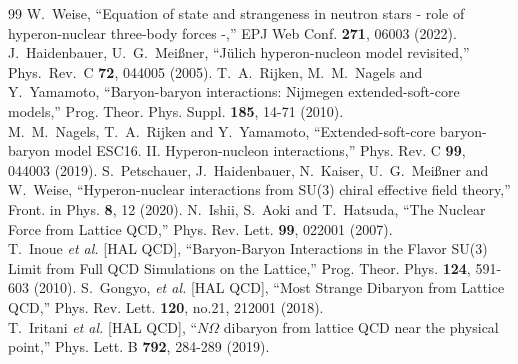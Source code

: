 \documentclass[aps,prd,showpacs,floatfix,reprint,nofootinbib]{revtex4-1}
\begin{document}
\begin{thebibliography}{99}
W.~Weise,
``Equation of state and strangeness in neutron stars - role of hyperon-nuclear three-body forces -,''
EPJ Web Conf. \textbf{271}, 06003 (2022).
J.~Haidenbauer, U.~G.~Mei\ss{}ner, 
``Jülich hyperon-nucleon model revisited,''
Phys.\ Rev.\ C \textbf{72}, 044005 (2005).
T.~A.~Rijken, M.~M.~Nagels and Y.~Yamamoto,
``Baryon-baryon interactions: Nijmegen extended-soft-core models,''
Prog. Theor. Phys. Suppl. \textbf{185}, 14-71 (2010).\\
M.~M.~Nagels, T.~A.~Rijken and Y.~Yamamoto,
``Extended-soft-core baryon-baryon model ESC16. II. Hyperon-nucleon interactions,''
Phys. Rev. C \textbf{99}, 044003 (2019).
S.~Petschauer, J.~Haidenbauer, N.~Kaiser, U.~G.~Mei\ss{}ner and W.~Weise,
``Hyperon-nuclear interactions from SU(3) chiral effective field theory,''
Front. in Phys. \textbf{8}, 12 (2020).
N.~Ishii, S.~Aoki and T.~Hatsuda,
``The Nuclear Force from Lattice QCD,''
Phys. Rev. Lett. \textbf{99}, 022001 (2007).\\
T.~Inoue \textit{et al.} [HAL QCD],
``Baryon-Baryon Interactions in the Flavor SU(3) Limit from Full QCD Simulations on the Lattice,''
Prog. Theor. Phys. \textbf{124}, 591-603 (2010).
S.~Gongyo, \textit{et al.} [HAL QCD],
``Most Strange Dibaryon from Lattice QCD,''
Phys. Rev. Lett. \textbf{120}, no.21, 212001 (2018).\\
T.~Iritani \textit{et al.} [HAL QCD],
``$N\Omega$ dibaryon from lattice QCD near the physical point,''
Phys. Lett. B \textbf{792}, 284-289 (2019).


\end{thebibliography}
\end{document}
